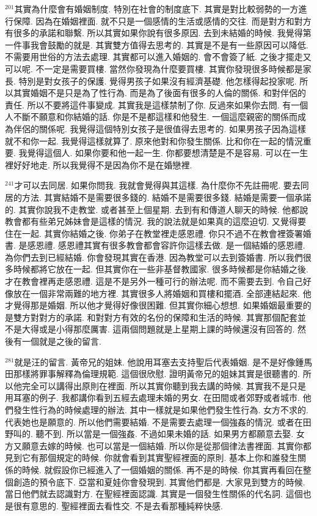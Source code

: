 \documentclass{book}
\begin{document}
$^{201}$其實為什麼會有婚姻制度.
特別在社會的制度底下.
其實是對比較弱勢的一方進行保障.
因為在婚姻裡面.
就不只是一個感情的生活或感情的交往.
而是對方和對方有很多的承諾和聯繫.
所以其實如果你說有很多原因.
去到未結婚的時候.
我覺得第一件事我會鼓勵的就是.
其實雙方值得去思考的.
其實是不是有一些原因可以降低.
不需要用世俗的方法去處理.
其實都可以進入婚姻的.
會不會簽了紙.
之後才擺走又可以呢.
不一定是需要買樓.
當然你發現為什麼要買樓.
其實你發現很多時候都是家長.
特別是對女孩子的保護.
覺得男孩子如果沒有經濟基礎.
他怎樣得起投家呢.
所以其實婚姻不是只是為了性行為.
而是為了後面有很多的人倫的關係.
和對伴侶的責任.
所以不要將這件事變成.
其實我是這樣禁制了你.
反過來如果你去問.
有一個人不斷不願意和你結婚的話.
你是不是都這樣和他發生.
一個這麼親密的關係而成為伴侶的關係呢.
我覺得這個特別女孩子是很值得去思考的.
如果男孩子因為這樣就不和你一起.
我覺得這樣就算了.
原來他對和你發生關係.
比和你在一起的情況重要.
我覺得這個人.
如果你要和他一起一生.
你都要想清楚是不是容易.
可以在一生裡好好地走.
所以我覺得不是因為你不是在婚戀裡.

$^{241}$才可以去同居.
如果你問我.
我就會覺得與其這樣.
為什麼你不先註冊呢.
要去同居的方法.
其實結婚不是需要很多錢的.
結婚不是需要很多錢.
結婚是需要一個承諾的.
其實你說我不走教堂.
或者甚至上個星期.
去到有和傳道人聊天的時候.
他都說教會都有些弟兄姊妹會是這樣的情況.
我的說法就是如果真的這麼迫切.
又覺得要住在一起.
其實你結婚之後.
你弟子在教堂裡走感恩禮.
你只不過不在教會裡簽署婚書.
是感恩禮.
感恩禮其實有很多教會都會容許你這樣去做.
是一個結婚的感恩禮.
為你們去到已經結婚.
你會發現其實在香港.
因為教堂可以去到簽婚書.
所以我們很多時候都將它放在一起.
但其實你在一些非基督教國家.
很多時候都是你結婚之後.
才在教會裡再走感恩禮.
這是不是另外一種可行的辦法呢.
而不需要去到.
令自己好像放在一個非常兩難的地方裡.
其實很多人將婚姻和買樓和擺酒.
全部連結起來.
他才覺得那是婚姻.
所以他才覺得好像很困難.
但其實你細心想想.
如果婚姻最重要的是雙方對對方的承諾.
和對對方有效的名份的保障和生活的時候.
其實那個配套並不是大得或是小得那麼厲害.
這兩個問題就是上星期上課的時候還沒有回答的.
然後有一個就是之後的留言.

$^{281}$就是汪的留言.
黃帝兄的姐妹.
他說用耳塞去支持聖后代表婚姻.
是不是好像鍾馬田那樣將罪事解釋為倫理規範.
這個很欣慰.
證明黃帝兄的姐妹其實是很聽書的.
所以他完全可以講得出原則在裡面.
所以其實你聽到我去講的時候.
其實我不是只是用耳塞的例子.
我都講你看到五經去處理未婚的男女.
在田間或者郊野或者城市.
他們發生性行為的時候處理的辦法.
其中一樣就是如果他們發生性行為.
女方不求的.
代表她也是願意的.
所以他們需要結婚.
不是需要去處理一個強姦的情況.
或者在田野叫的.
聽不到.
所以當是一個強姦.
不過如果未婚的話.
如果男方都願意去娶.
女方又願意去嫁的時候.
也可以當是一個結婚.
所以你是從那個律法書裡面.
其實你都見到它有那個規定的時候.
你就會看到其實聖經裡面的原則.
基本上你和誰發生關係的時候.
就假設你已經進入了一個婚姻的關係.
再不是的時候.
你其實再看回在整個創造的預令底下.
亞當和夏娃你會發現到.
其實他們都是.
大家見到雙方的時候.
當日他們就去認識對方.
在聖經裡面認識.
其實是一個發生性關係的代名詞.
這個也是很有意思的.
聖經裡面去看性交.
不是去看那種純粹快感.
\end{document}
